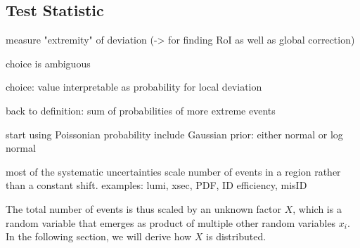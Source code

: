 
\subsection{Test Statistic}
\label{sec:test_statistic}

measure "extremity" of deviation (-> for finding RoI as well as global correction)

choice is ambiguous

choice: value interpretable as probability for local deviation

back to definition: sum of probabilities of more extreme events

start using Poissonian probability
include Gaussian prior: either normal or log normal


most of the systematic uncertainties scale number of events in a region rather than a constant shift. examples: lumi, xsec, PDF, ID efficiency, misID


The total number of events is thus scaled by an unknown factor $X$, which is a random variable that emerges as product of multiple other random variables $x_i$.
In the following section, we will derive how $X$ is distributed.

